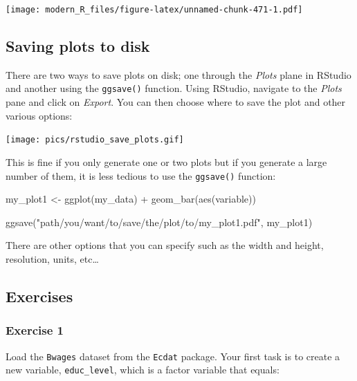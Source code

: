 \documentclass[
]{article}
\newenvironment{Shaded}{\begin{snugshade}}{\end{snugshade}}
\newcommand{\FunctionTok}[1]{\textcolor[rgb]{0.00,0.00,0.00}{#1}}
\newcommand{\NormalTok}[1]{#1}
\newcommand{\OtherTok}[1]{\textcolor[rgb]{0.56,0.35,0.01}{#1}}
\newcommand{\SpecialCharTok}[1]{\textcolor[rgb]{0.00,0.00,0.00}{#1}}
\newcommand{\StringTok}[1]{\textcolor[rgb]{0.31,0.60,0.02}{#1}}
\begin{document}
\texttt{[image: modern\_R\_files/figure-latex/unnamed-chunk-471-1.pdf]}

\hypertarget{saving-plots-to-disk}{%
\subsection{Saving plots to disk}\label{saving-plots-to-disk}}

There are two ways to save plots on disk; one through the \emph{Plots} plane in RStudio and another using the
\texttt{ggsave()} function. Using RStudio, navigate to the \emph{Plots} pane and click on \emph{Export}. You can
then choose where to save the plot and other various options:

\texttt{[image: pics/rstudio\_save\_plots.gif]}

This is fine if you only generate one or two plots but if you generate a large number of them, it
is less tedious to use the \texttt{ggsave()} function:

\begin{Shaded}
\begin{Highlighting}[]
\NormalTok{my\_plot1 }\OtherTok{\textless{}{-}} \FunctionTok{ggplot}\NormalTok{(my\_data) }\SpecialCharTok{+}
  \FunctionTok{geom\_bar}\NormalTok{(}\FunctionTok{aes}\NormalTok{(variable))}

\FunctionTok{ggsave}\NormalTok{(}\StringTok{"path/you/want/to/save/the/plot/to/my\_plot1.pdf"}\NormalTok{, my\_plot1)}
\end{Highlighting}
\end{Shaded}

There are other options that you can specify such as the width and height, resolution, units,
etc\ldots{}

\hypertarget{exercises-3}{%
\subsection{Exercises}\label{exercises-3}}

\hypertarget{exercise-1-3}{%
\subsubsection*{Exercise 1}\label{exercise-1-3}}

Load the \texttt{Bwages} dataset from the \texttt{Ecdat} package. Your first task is to create a new variable,
\texttt{educ\_level}, which is a factor variable that equals:
\end{document}
